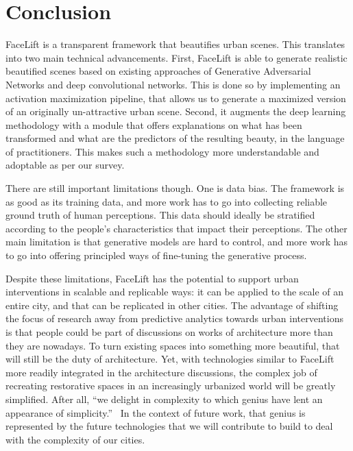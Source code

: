 \section{Conclusion}
\label{sec:discussion}

FaceLift is a transparent framework that beautifies urban scenes. This translates into two main technical advancements. First, FaceLift is able to generate realistic beautified scenes based on existing approaches of  Generative Adversarial Networks and deep convolutional networks. This is done so by implementing an activation maximization pipeline, that allows us to generate a maximized version of an originally un-attractive urban scene.  Second, it augments the deep learning methodology with a module that offers explanations on what has been transformed and what are the predictors of the resulting beauty, in the language of practitioners. This makes such a methodology more understandable and adoptable as per our survey. 

There are still important limitations though. One is data bias. The framework is as good as its training data, and more work has to go into collecting reliable ground truth of human perceptions. This data should ideally be stratified according to the people's characteristics that  impact their perceptions. The other main limitation is that generative models are hard to control, and more work has to go into offering principled ways of fine-tuning the generative process.

Despite these limitations, FaceLift has the potential to support urban interventions  in scalable  and replicable ways: it can be applied to the scale of an entire city, and that  can be replicated in other cities. The advantage of shifting the focus of research away from predictive analytics towards urban interventions is that people could be part of discussions on works of architecture  more than they are nowadays. To turn existing spaces into something more beautiful, that will still be the duty of architecture. Yet, with technologies similar to FaceLift more readily integrated in the architecture discussions, the complex job of recreating restorative spaces in an increasingly urbanized world will be greatly simplified.  After all, ``we delight in complexity to which genius have lent an appearance of simplicity.''~\cite{de2008architecture} In the context of future work, that genius is represented by the future technologies that we will contribute to build to deal with the complexity of our cities.



